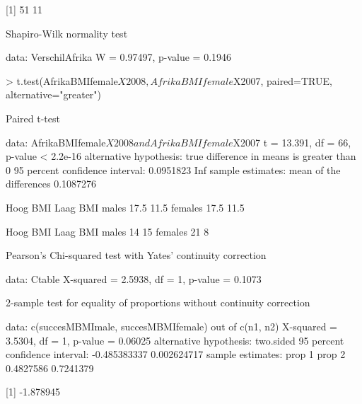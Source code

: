 [1] 51 11

	Shapiro-Wilk normality test

data:  VerschilAfrika
W = 0.97497, p-value = 0.1946

> t.test(AfrikaBMIfemale$X2008, AfrikaBMIfemale$X2007, paired=TRUE, alternative="greater")

	Paired t-test

data:  AfrikaBMIfemale$X2008 and AfrikaBMIfemale$X2007
t = 13.391, df = 66, p-value < 2.2e-16
alternative hypothesis: true difference in means is greater than 0
95 percent confidence interval:
 0.0951823       Inf
sample estimates:
mean of the differences 
              0.1087276 

        Hoog BMI Laag BMI
males       17.5     11.5
females     17.5     11.5

        Hoog BMI Laag BMI
males         14       15
females       21        8


	Pearson's Chi-squared test with Yates' continuity correction

data:  Ctable
X-squared = 2.5938, df = 1, p-value = 0.1073


	2-sample test for equality of proportions without continuity correction

data:  c(succesMBMImale, succesMBMIfemale) out of c(n1, n2)
X-squared = 3.5304, df = 1, p-value = 0.06025
alternative hypothesis: two.sided
95 percent confidence interval:
 -0.485383337  0.002624717
sample estimates:
   prop 1    prop 2 
0.4827586 0.7241379 

[1] -1.878945